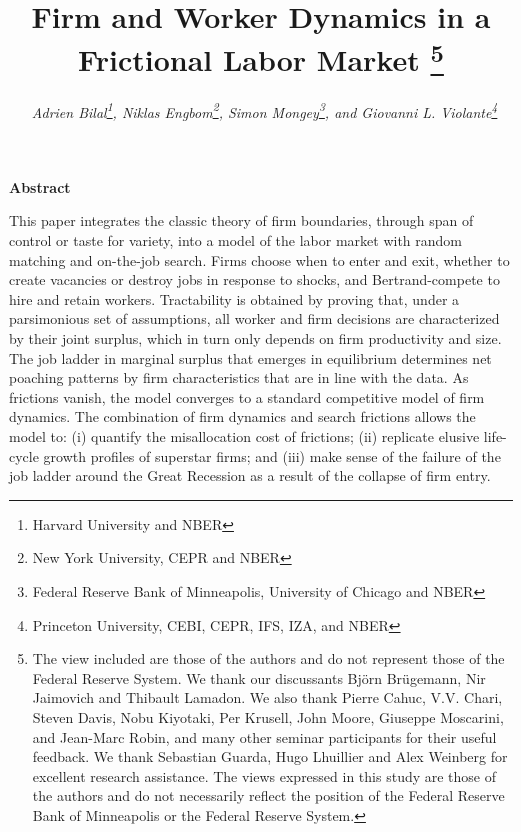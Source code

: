 



\title{\vspace*{-2.5cm}Firm and Worker Dynamics in a Frictional Labor Market %
\thanks{%
The view included are those of the authors and do not represent those of the Federal Reserve System.
We thank our discussants Bj\"{o}rn Br\"{u}gemann, Nir Jaimovich and Thibault Lamadon.
We also thank Pierre Cahuc, V.V. Chari, Steven Davis, Nobu Kiyotaki, Per Krusell, John Moore, Giuseppe Moscarini, and Jean-Marc Robin, and many other seminar participants for their useful feedback.
We thank Sebastian Guarda, Hugo Lhuillier and Alex Weinberg for excellent research assistance.
The views expressed in this study are those of the authors and do not necessarily reflect the position of the Federal Reserve Bank of Minneapolis or the Federal Reserve System.
}
}
\author{\textit{\ Adrien Bilal\thanks{%
Harvard University and NBER},\hspace{.2cm} Niklas Engbom\thanks{%
New York University, CEPR and NBER},\hspace{.2cm} Simon Mongey\thanks{%
Federal Reserve Bank of Minneapolis, University of Chicago and NBER},\hspace{.2cm} and \hspace{.2cm} Giovanni L.
Violante\thanks{%
Princeton University, CEBI, CEPR, IFS, IZA, and NBER}}\vspace*{0.7cm}}
\maketitle

\begin{center}
\textbf{Abstract}
\end{center}

\noindent
This paper integrates the classic theory of firm boundaries, through span of control or taste for variety, into a model of the labor market with random matching and on-the-job search. Firms choose when to enter and exit, whether to create vacancies or destroy jobs in response to shocks, and Bertrand-compete to hire and retain workers. Tractability is obtained by proving that, under a parsimonious set of assumptions, all worker and firm decisions are characterized by their joint surplus, which in turn only depends on firm productivity and size. The job ladder in marginal surplus that emerges in equilibrium determines net poaching patterns by firm characteristics that are in line with the data. As frictions vanish, the model converges to a standard competitive model of firm dynamics. The combination of firm dynamics and search frictions allows the model to: (i) quantify the misallocation cost of frictions; (ii) replicate elusive life-cycle growth profiles of superstar firms; and (iii) make sense of the failure of the job ladder around the Great Recession as a result of the collapse of firm entry.

